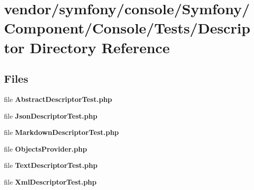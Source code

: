 \section{vendor/symfony/console/\+Symfony/\+Component/\+Console/\+Tests/\+Descriptor Directory Reference}
\label{dir_5d963cdf787047506a89d0f6de69873f}
\subsection*{Files}
\begin{DoxyCompactItemize}
\item 
file {\bf Abstract\+Descriptor\+Test.\+php}
\item 
file {\bf Json\+Descriptor\+Test.\+php}
\item 
file {\bf Markdown\+Descriptor\+Test.\+php}
\item 
file {\bf Objects\+Provider.\+php}
\item 
file {\bf Text\+Descriptor\+Test.\+php}
\item 
file {\bf Xml\+Descriptor\+Test.\+php}
\end{DoxyCompactItemize}
